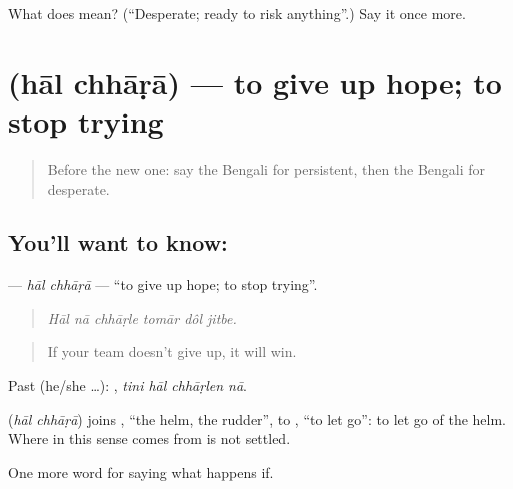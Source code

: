 \begin{tcolorbox}[breakable,colback=teal!4,colframe=teal!35!black,title={Before you move on}]
What does  mean? (\textquotedblleft{}Desperate; ready to risk anything\textquotedblright{}.) Say it once more.
\end{tcolorbox}
\section[\texorpdfstring{\bn{হাল} \bn{ছাড়া} (hāl chhāṛā)}{হাল ছাড়া (hāl chhāṛā)}]{  (hāl chhāṛā) — to give up hope; to stop trying}

\label{lesson:BN-C539-hal-chhara}



\begin{quote}
Before the new one: say the Bengali for persistent, then the Bengali for desperate.
\end{quote}

\subsection*{You'll want to know:  }
\textbf{ } — \emph{hāl chhāṛā} — \textquotedblleft{}to give up hope; to stop trying\textquotedblright{}.

\begin{quote}
     
\end{quote}

\begin{quote}
\emph{Hāl nā chhāṛle tomār dôl jitbe.}
\end{quote}

\begin{quote}
If your team doesn't give up, it will win.
\end{quote}

Past (he/she …):    , \emph{tini hāl chhāṛlen nā}.

\begin{cousinweb}
\textbf{ } (\emph{hāl chhāṛā}) joins , \textquotedblleft{}the helm, the rudder\textquotedblright{}, to , \textquotedblleft{}to let go\textquotedblright{}: to let go of the helm. Where  in this sense comes from is not settled.
\end{cousinweb}

\begin{grammarlens}[title={What you've built}]
One more word for saying what happens if.
\end{grammarlens}

